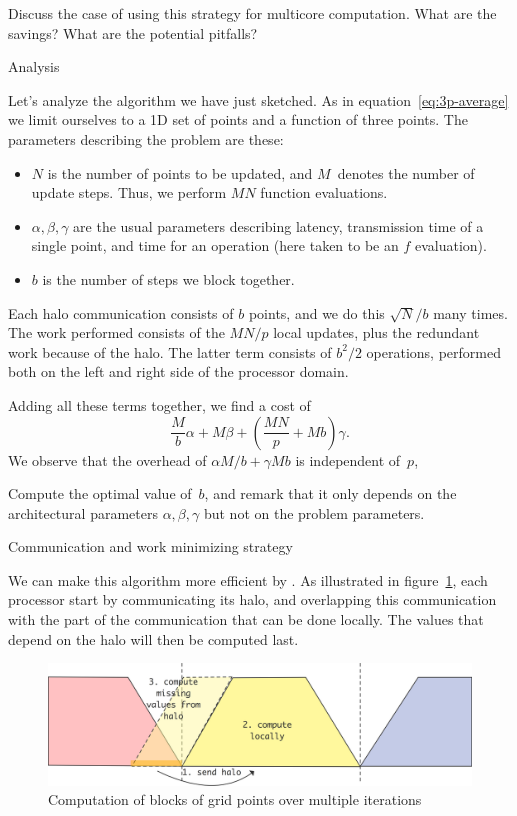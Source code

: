 \begin{exercise}
  Discuss the case of using this strategy for multicore computation.
  What are the savings? What are the potential pitfalls?
\end{exercise}

 {Analysis}

Let's analyze the algorithm we have just sketched.  As in
equation~\eqref{eq:3p-average} we limit ourselves to a 1D set of
points and a function of three points. The parameters describing the
problem are these:
\begin{itemize}
\item $N$ is the number of points to be updated, and $M$~denotes the
  number of update steps. Thus, we perform $MN$ function evaluations.
\item $\alpha,\beta,\gamma$ are the usual parameters describing
  latency, transmission time of a single point, and time for an
  operation (here taken to be an $f$ evaluation).
\item $b$ is the number of steps we block together.
\end{itemize}
Each halo communication consists of $b$ points, and we do this $\sqrt
N/b$ many times.  The work performed consists of the $MN/p$ local
updates, plus the redundant work because of the halo. The latter term
consists of $b^2/2$ operations, performed both on the left and right
side of the processor domain.

Adding all these terms together, we find a cost of
\[ \frac Mb\alpha+M\beta+\left(\frac {MN}p+Mb\right)\gamma. \]
We observe that the overhead of $\alpha M/b+\gamma Mb$ is independent of~$p$,
\begin{exercise}
  Compute the optimal value of~$b$, and remark that it only depends on
  the architectural parameters $\alpha,\beta,\gamma$ but not on the
  problem parameters.
\end{exercise}

 {Communication and work minimizing strategy}

We can make this algorithm more efficient by 
.
As illustrated in
figure~\ref{fig:grid-update-local}, each processor start by
communicating its halo, and overlapping this communication with the
part of the communication that can be done locally. The values that
depend on the halo will then be computed last.

\begin{figure}[ht]
\includegraphics[scale=.1]{graphics/grid-update-local}
\caption{Computation of blocks of grid points over multiple iterations}
\label{fig:grid-update-local}
\end{figure}

